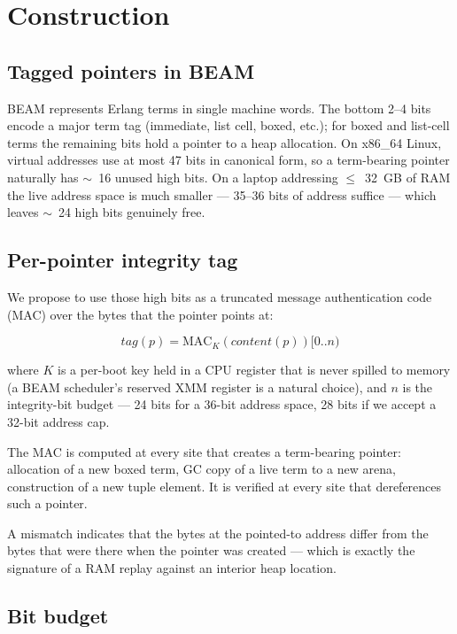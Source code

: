 \documentclass[10pt,a4paper]{article}
\begin{document}
\section{Construction}

\subsection{Tagged pointers in BEAM}

BEAM represents Erlang terms in single machine words. The bottom 2--4
bits encode a major term tag (immediate, list cell, boxed, etc.); for
boxed and list-cell terms the remaining bits hold a pointer to a heap
allocation. On x86\_64 Linux, virtual addresses use at most 47 bits in
canonical form, so a term-bearing pointer naturally has $\sim$~16
unused high bits. On a laptop addressing $\le$~32~GB of RAM the live
address space is much smaller --- 35--36 bits of address suffice ---
which leaves $\sim$~24 high bits genuinely free.

\subsection{Per-pointer integrity tag}

We propose to use those high bits as a truncated message authentication
code (MAC) over the bytes that the pointer points at:

\begin{equation*}
\mathit{tag}(p) = \mathrm{MAC}_K(\mathit{content}(p))[0..n)
\end{equation*}

where $K$ is a per-boot key held in a CPU register that is never spilled
to memory (a BEAM scheduler's reserved XMM register is a natural choice),
and $n$ is the integrity-bit budget --- 24 bits for a 36-bit address
space, 28 bits if we accept a 32-bit address cap.

The MAC is computed at every site that creates a term-bearing pointer:
allocation of a new boxed term, GC copy of a live term to a new arena,
construction of a new tuple element. It is verified at every site that
dereferences such a pointer.

A mismatch indicates that the bytes at the pointed-to address differ
from the bytes that were there when the pointer was created --- which
is exactly the signature of a RAM replay against an interior heap
location.

\subsection{Bit budget}
\end{document}
